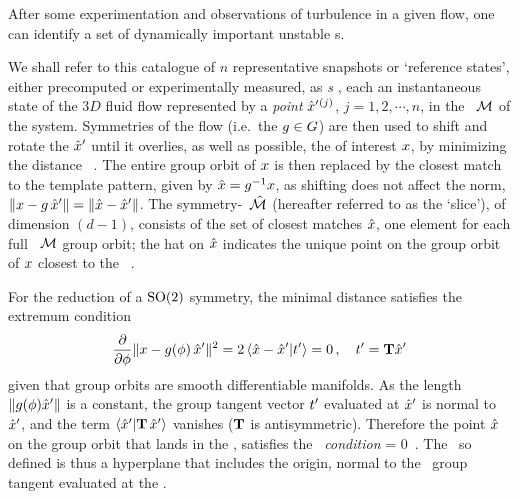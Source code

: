 After some experimentation and observations of turbulence in a given
flow, one can identify a set of dynamically important unstable
{\recurrStr s}.

We shall refer to this catalogue of $n$ representative snapshots or
`reference states', either precomputed or experimentally measured, as
\emph{\template s} \citep{rowley_reconstruction_2000}, each an
instantaneous state of the $3D$ fluid flow represented by a \emph{point}
${\hat{x}'}{}^{(j)}$, $j=1,2,\cdots,n$, in the \statesp\ ${\cal M}$ of the
system. Symmetries of the flow (i.e.\ the $g\in G$) are then
used to shift and rotate the {\template} ${\hat{x}'}$ until it overlies, as
well as possible, the {\cohStr} of interest $x$, by minimizing the
distance
\beq
\Norm{\ssp - \LieEl(\gSpace)\,\slicep}
\, .
The entire group orbit of $\ssp$ is then replaced by the closest match to
the template pattern, given by $\sspRed=\LieEl^{-1}\ssp$, as shifting
does not affect the norm,
$\Norm{\ssp-\LieEl\,\slicep}=\Norm{\sspRed-\slicep}$. The
symmetry-\reducedsp\ $\pSRed$ (hereafter referred to as the `slice'), of
dimension $(d\!-\!1)$, consists of the set of closest matches $\sspRed$,
one element for each full \statesp\ $\pS$ group orbit; the hat on
$\sspRed$ indicates the unique point on the group orbit of $\ssp$ closest
to the \template\ \slicep.

For the reduction of a
$\SOn{2}$ symmetry, the minimal distance satisfies the extremum
condition
\[
\frac{\partial}{\partial \gSpace} \Norm{\ssp - \LieEl(\gSpace)\,\slicep}^2
   =
2\, \braket{\sspRed - \slicep}{\sliceTan{}}
   = 0
        \,,\quad
\sliceTan{} = \Lg \slicep
\]
given that group orbits are smooth differentiable manifolds. As
the length
$\|{g({\bf \phi}){\hat{x}'}}\|$ is a constant, the group tangent vector
$t'_{}$ evaluated at ${\hat{x}'}$  is normal to
${\hat{x}'}$, and the term $\braket{\slicep}{\Lg \,\slicep}$ vanishes ($\mathbf{T}$
is antisymmetric). Therefore the point $\hat{x}$ on the group orbit that
lands in the \slice, satisfies the \emph{\slice\ condition}
\beq
\braket{\sspRed}{\sliceTan{}} = 0
    \,.
The \slice\ so defined is thus a hyperplane that includes the origin,
normal to the \template\ group tangent evaluated at the \template.


